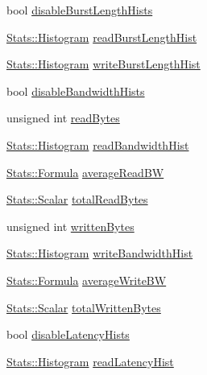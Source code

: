 \begin{DoxyCompactItemize}
\item 
bool \hyperlink{structCommMonitor_1_1MonitorStats_ab59fda1fe2ca1c0914f9036cc7f99b24}{disableBurstLengthHists}
\item 
\hyperlink{classStats_1_1Histogram}{Stats::Histogram} \hyperlink{structCommMonitor_1_1MonitorStats_a13870c09c7ac8408c22d8496f77deb21}{readBurstLengthHist}
\item 
\hyperlink{classStats_1_1Histogram}{Stats::Histogram} \hyperlink{structCommMonitor_1_1MonitorStats_a338971eda5dd232fa8933ee78c36f6a5}{writeBurstLengthHist}
\item 
bool \hyperlink{structCommMonitor_1_1MonitorStats_af2f6541f615db84468379c791765da96}{disableBandwidthHists}
\item 
unsigned int \hyperlink{structCommMonitor_1_1MonitorStats_a7229cb3b887686f75714605936a6c0f0}{readBytes}
\item 
\hyperlink{classStats_1_1Histogram}{Stats::Histogram} \hyperlink{structCommMonitor_1_1MonitorStats_a4498b86fd1613e25f2d6d7b5d73b12fe}{readBandwidthHist}
\item 
\hyperlink{classStats_1_1Formula}{Stats::Formula} \hyperlink{structCommMonitor_1_1MonitorStats_a7939b97651af67ffa8d8538cf361eddd}{averageReadBW}
\item 
\hyperlink{classStats_1_1Scalar}{Stats::Scalar} \hyperlink{structCommMonitor_1_1MonitorStats_af214c67519878ead4b72a004fc63f061}{totalReadBytes}
\item 
unsigned int \hyperlink{structCommMonitor_1_1MonitorStats_ae02abb4b2d55a59759efa00ae4fc5f21}{writtenBytes}
\item 
\hyperlink{classStats_1_1Histogram}{Stats::Histogram} \hyperlink{structCommMonitor_1_1MonitorStats_a9099de3107049308efe76f8cc17b204c}{writeBandwidthHist}
\item 
\hyperlink{classStats_1_1Formula}{Stats::Formula} \hyperlink{structCommMonitor_1_1MonitorStats_a8a417eebd4d05e2ca471b036b1fb293c}{averageWriteBW}
\item 
\hyperlink{classStats_1_1Scalar}{Stats::Scalar} \hyperlink{structCommMonitor_1_1MonitorStats_ab2ff0d6e4d3f80d6e4dc46748ee467ff}{totalWrittenBytes}
\item 
bool \hyperlink{structCommMonitor_1_1MonitorStats_a072da0821025a37ba56aa59e2dc7ba75}{disableLatencyHists}
\item 
\hyperlink{classStats_1_1Histogram}{Stats::Histogram} \hyperlink{structCommMonitor_1_1MonitorStats_ac0d798255fcda6961d92d727c4f561e9}{readLatencyHist}

\end{DoxyCompactItemize}
